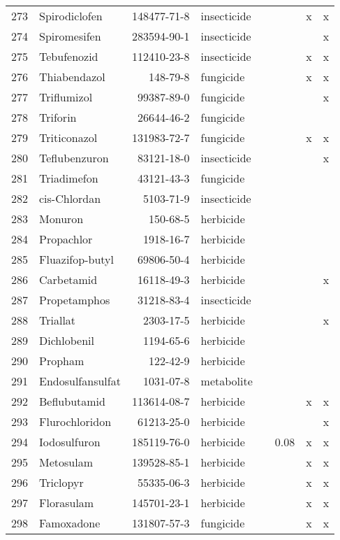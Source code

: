 \begin{longtable}{lp{4cm}rlp{1cm}p{1.5cm}p{1.5cm}p{1cm}}
  273 & Spirodiclofen & 148477-71-8 & insecticide &  &  & x & x \\ 
  274 & Spiromesifen & 283594-90-1 & insecticide &  &  &  & x \\ 
  275 & Tebufenozid & 112410-23-8 & insecticide &  &  & x & x \\ 
  276 & Thiabendazol & 148-79-8 & fungicide &  &  & x & x \\ 
  277 & Triflumizol & 99387-89-0 & fungicide &  &  &  & x \\ 
  278 & Triforin & 26644-46-2 & fungicide &  &  &  &  \\ 
  279 & Triticonazol & 131983-72-7 & fungicide &  &  & x & x \\ 
  280 & Teflubenzuron & 83121-18-0 & insecticide &  &  &  & x \\ 
  281 & Triadimefon & 43121-43-3 & fungicide &  &  &  &  \\ 
  282 & cis-Chlordan & 5103-71-9 & insecticide &  &  &  &  \\ 
  283 & Monuron & 150-68-5 & herbicide &  &  &  &  \\ 
  284 & Propachlor & 1918-16-7 & herbicide &  &  &  &  \\ 
  285 & Fluazifop-butyl & 69806-50-4 & herbicide &  &  &  &  \\ 
  286 & Carbetamid & 16118-49-3 & herbicide &  &  &  & x \\ 
  287 & Propetamphos & 31218-83-4 & insecticide &  &  &  &  \\ 
  288 & Triallat & 2303-17-5 & herbicide &  &  &  & x \\ 
  289 & Dichlobenil & 1194-65-6 & herbicide &  &  &  &  \\ 
  290 & Propham & 122-42-9 & herbicide &  &  &  &  \\ 
  291 & Endosulfansulfat & 1031-07-8 & metabolite &  &  &  &  \\ 
  292 & Beflubutamid & 113614-08-7 & herbicide &  &  & x & x \\ 
  293 & Flurochloridon & 61213-25-0 & herbicide &  &  &  & x \\ 
  294 & Iodosulfuron & 185119-76-0 & herbicide &  & 0.08 & x & x \\ 
  295 & Metosulam & 139528-85-1 & herbicide &  &  & x & x \\ 
  296 & Triclopyr & 55335-06-3 & herbicide &  &  & x & x \\ 
  297 & Florasulam & 145701-23-1 & herbicide &  &  & x & x \\ 
  298 & Famoxadone & 131807-57-3 & fungicide &  &  & x & x \\ 

\end{longtable}
